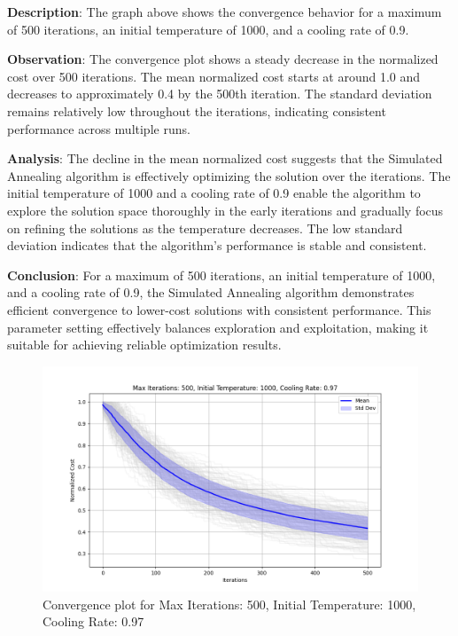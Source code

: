 \documentclass[
]{article}
\begin{document}
    \textbf{Description}: The graph above shows the convergence behavior for a maximum of 500 iterations, an initial temperature of 1000, and a cooling rate of 0.9.

    \textbf{Observation}: The convergence plot shows a steady decrease in the normalized cost over 500 iterations. The mean normalized cost starts at around 1.0 and decreases to approximately 0.4 by the 500th iteration. The standard deviation remains relatively low throughout the iterations, indicating consistent performance across multiple runs.

    \textbf{Analysis}: The decline in the mean normalized cost suggests that the Simulated Annealing algorithm is effectively optimizing the solution over the iterations. The initial temperature of 1000 and a cooling rate of 0.9 enable the algorithm to explore the solution space thoroughly in the early iterations and gradually focus on refining the solutions as the temperature decreases. The low standard deviation indicates that the algorithm's performance is stable and consistent.

    \textbf{Conclusion}: For a maximum of 500 iterations, an initial temperature of 1000, and a cooling rate of 0.9, the Simulated Annealing algorithm demonstrates efficient convergence to lower-cost solutions with consistent performance. This parameter setting effectively balances exploration and exploitation, making it suitable for achieving reliable optimization results.

    \begin{figure}[H]
        \centering
        \includegraphics[width=\textwidth]{simulated_annealing/max_iter_500_init_temp_1000_cooling_rate_0.97}
        \caption{Convergence plot for Max Iterations: 500, Initial Temperature: 1000, Cooling Rate: 0.97}
        \label{fig:sa_500_1000_0.97}
    \end{figure}
\end{document}
